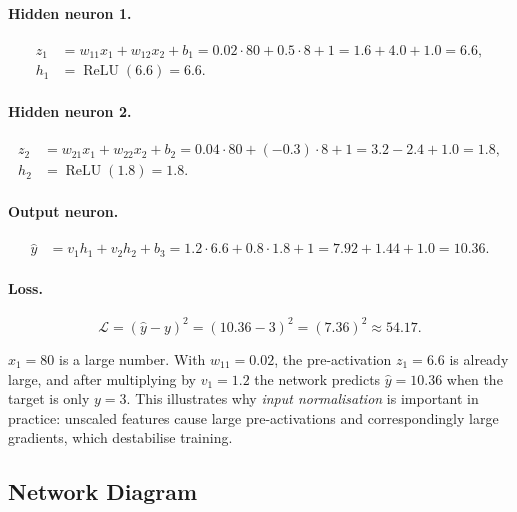 \documentclass[12pt,a4paper]{article}
\newcommand{\Loss}{\mathcal{L}}
\newcommand{\ReLU}{\operatorname{ReLU}}
\newcommand{\yhat}{\hat{y}}
\begin{document}
\paragraph{Hidden neuron 1.}
\begin{align}
  z_1 &= w_{11} x_1 + w_{12} x_2 + b_1
       = 0.02\cdot80 + 0.5\cdot8 + 1
       = 1.6 + 4.0 + 1.0 = 6.6, \label{eq:z1}\\
  h_1 &= \ReLU(6.6) = 6.6. \label{eq:h1}
\end{align}

\paragraph{Hidden neuron 2.}
\begin{align}
  z_2 &= w_{21} x_1 + w_{22} x_2 + b_2
       = 0.04\cdot80 + (-0.3)\cdot8 + 1
       = 3.2 - 2.4 + 1.0 = 1.8, \label{eq:z2}\\
  h_2 &= \ReLU(1.8) = 1.8. \label{eq:h2}
\end{align}

\paragraph{Output neuron.}
\begin{align}
  \yhat &= v_1 h_1 + v_2 h_2 + b_3
         = 1.2\cdot6.6 + 0.8\cdot1.8 + 1
         = 7.92 + 1.44 + 1.0 = 10.36. \label{eq:yhat}
\end{align}

\paragraph{Loss.}
\begin{equation}
  \Loss = (\yhat - y)^2 = (10.36 - 3)^2 = (7.36)^2 \approx 54.17.
  \label{eq:loss-val}
\end{equation}

\begin{example}
$x_1 = 80$ is a large number.
With $w_{11} = 0.02$, the pre-activation $z_1 = 6.6$ is already large,
and after multiplying by $v_1 = 1.2$ the network predicts $\yhat = 10.36$
when the target is only $y = 3$.
This illustrates why \emph{input normalisation} is important in practice:
unscaled features cause large pre-activations and correspondingly large
gradients, which destabilise training.
\end{example}

\subsection{Network Diagram}
\end{document}

